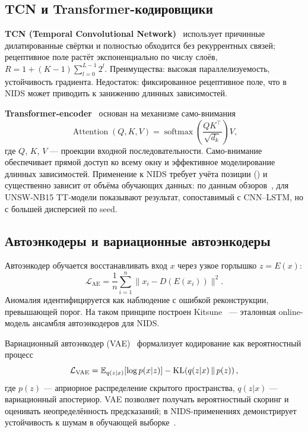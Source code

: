 \subsection{TCN и Transformer-кодировщики}

\textbf{TCN (Temporal Convolutional Network)}~\cite{bai2018tcn} использует
причинные дилатированные свёртки и полностью обходится без рекуррентных
связей; рецептивное поле растёт экспоненциально по числу слоёв,
\(R = 1 + (K-1)\sum_{l=0}^{L-1} 2^l\). Преимущества: высокая параллелизуемость,
устойчивость градиента. Недостаток: фиксированное рецептивное поле, что в
NIDS может приводить к занижению длинных зависимостей.

\textbf{Transformer-encoder}~\cite{vaswani2017attention} основан на
механизме само-внимания
\begin{equation}
\operatorname{Attention}(Q, K, V) =
\operatorname{softmax}\!\left(\frac{QK^{\top}}{\sqrt{d_k}}\right) V,
\label{eq:attention}
\end{equation}
где \(Q\), \(K\), \(V\) --- проекции входной последовательности.
Само-внимание обеспечивает прямой доступ ко всему окну и эффективное
моделирование длинных зависимостей. Применение к NIDS требует учёта позиции
() и существенно зависит от объёма обучающих данных:
по данным обзоров~\cite{ferrag2020dlcyber, ahmad2021nids}, для UNSW-NB15
TT-модели показывают результат, сопоставимый с CNN--LSTM, но с большей
дисперсией по seed.

\subsection{Автоэнкодеры и вариационные автоэнкодеры}

Автоэнкодер обучается восстанавливать вход \(x\) через узкое горлышко
\(z = E(x)\):
\begin{equation}
\mathcal{L}_{\text{AE}} = \frac{1}{n}\sum_{i=1}^{n} \|x_i - D(E(x_i))\|^{2}.
\label{eq:ae}
\end{equation}
Аномалия идентифицируется как наблюдение с ошибкой реконструкции, превышающей
порог. На таком принципе построен Kitsune~\cite{mirsky2018kitsune} ---
эталонная online-модель ансамбля автоэнкодеров для NIDS.

Вариационный автоэнкодер (VAE)~\cite{kingma2014vae} формализует кодирование
как вероятностный процесс
\begin{equation}
\mathcal{L}_{\text{VAE}} =
\mathbb{E}_{q(z|x)}[\log p(x|z)] - \operatorname{KL}\!\left(q(z|x)\,\|\,p(z)\right),
\label{eq:vae}
\end{equation}
где \(p(z)\) --- априорное распределение скрытого пространства,
\(q(z|x)\) --- вариационный апостериор. VAE позволяет получать вероятностный
скоринг и оценивать неопределённость предсказаний; в NIDS-применениях
демонстрирует устойчивость к шумам в обучающей выборке~\cite{lopez2017cvae}.


